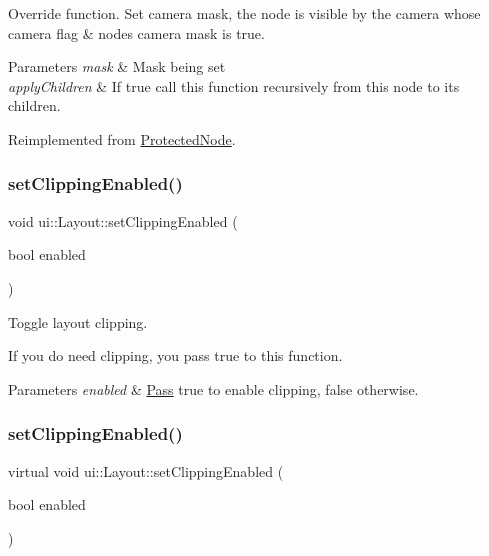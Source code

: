 Override function. Set camera mask, the node is visible by the camera whose camera flag \& node\textquotesingle{}s camera mask is true. 
\begin{DoxyParams}{Parameters}
{\em mask} & Mask being set \\
\hline
{\em apply\+Children} & If true call this function recursively from this node to its children. \\
\hline
\end{DoxyParams}


Reimplemented from \hyperlink{classProtectedNode_a45ddaa88c746ea6707b8a09bb50b457d}{Protected\+Node}.

\mbox{\label{classui_1_1Layout_ad8b2d7b694acba184356fe2a4680f192}} 
\subsubsection{\texorpdfstring{set\+Clipping\+Enabled()}{setClippingEnabled()}\hspace{0.1cm}{\footnotesize\ttfamily [1/2]}}
{\footnotesize\ttfamily void ui\+::\+Layout\+::set\+Clipping\+Enabled (\begin{DoxyParamCaption}\item[{bool}]{enabled }\end{DoxyParamCaption})\hspace{0.3cm}{\ttfamily [virtual]}}

Toggle layout clipping.

If you do need clipping, you pass true to this function.


\begin{DoxyParams}{Parameters}
{\em enabled} & \hyperlink{classPass}{Pass} true to enable clipping, false otherwise. \\
\hline
\end{DoxyParams}
\mbox{\label{classui_1_1Layout_a53ebd3db75c794eb07386377b9dc6edd}} 
\subsubsection{\texorpdfstring{set\+Clipping\+Enabled()}{setClippingEnabled()}\hspace{0.1cm}{\footnotesize\ttfamily [2/2]}}
{\footnotesize\ttfamily virtual void ui\+::\+Layout\+::set\+Clipping\+Enabled (\begin{DoxyParamCaption}\item[{bool}]{enabled }\end{DoxyParamCaption})\hspace{0.3cm}{\ttfamily [virtual]}}

